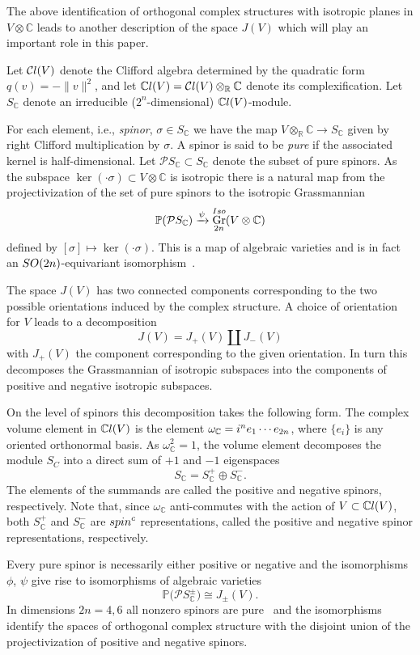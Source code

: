 \documentclass[11pt]{article}
\numberwithin{equation}{section}
\newcommand{\R}{\mathbb{R}}
\newcommand{\C}{\mathbb{C}}
\DeclareMathOperator{\Gr}{Gr}
\newcommand{\Cl}{\mathcal{C}{\rm l}}
\newcommand{\CCl}{\mathbb{C}{\rm l}}
\numberwithin{equation}{section}
\begin{document}
The above identification of orthogonal complex structures with isotropic planes in
$V\otimes \C$ leads to another description of the space $J(V)$ which will play an
important role in this paper.


Let $\Cl(V)$ denote the Clifford algebra determined by the quadratic form $q(v)=-\|v\|^2$, and let $\CCl(V)=\Cl(V)\otimes_\R \C$
denote its complexification. Let $S_{\C}$ denote an irreducible ($2^n$-dimensional) $\CCl(V)$-module.

For each element, i.e., \emph{spinor}, $\sigma \in S_{\C}$ we have the map $V\otimes_\R \C \to S_{\C}$ given by right Clifford multiplication by $\sigma$. A spinor is said to be \emph{pure} if the associated kernel is half-dimensional. Let ${\mathcal P}S _{\C} \subset S_\C$ denote the subset of pure spinors. As the subspace $\ker (\cdot \sigma) \subset V\otimes \C$ is isotropic
there is a natural map from the projectivization of the set of pure spinors to the isotropic Grassmannian
\[
\mathbb{P}( {\mathcal P}S _\C ) \xrightarrow{\psi} \Gr^{\rm Iso}_{2n}(V\otimes \C)
\]
defined by $[\sigma] \mapsto \ker (\cdot \sigma)$. This is a map of algebraic varieties and is in fact an ${\rm SO}(2n)$-equivariant isomorphism~\cite[Proposition~IV.9.7]{LM}.

The space $J(V)$ has two connected components corresponding to the two possible orientations induced by the complex structure. A choice of orientation for $V$ leads to a decomposition
\[J(V) = J_+(V) \coprod J_-(V)\]
with $J_+(V)$ the component corresponding to the given orientation. In turn this decomposes the Grassmannian of isotropic subspaces into the components of positive and negative isotropic subspaces.

On the level of spinors this decomposition takes the following form.
The complex volume element in $\CCl(V)$ is the element
$\omega_\C = {\rm i}^n e_1 \cdots e_{2n}$, where
$\{e_i\}$ is any oriented orthonormal basis. As $\omega_{\C}^2=1$, the volume element decomposes
the module $S_C$ into a direct sum of $+1$ and $-1$ eigenspaces
\[
S_\C = S_\C^+ \oplus S_\C^-.
\]
The elements of the summands are called the positive and negative spinors, respectively.
Note that, since $\omega_\C$ anti-commutes with the action of $V \subset \CCl(V)$, both
$S_\C^+$ and $S_\C^-$ are ${\rm spin}^{\rm c}$ representations, called the positive and negative spinor representations, respectively.

Every pure spinor is necessarily either positive or negative and the isomorphisms $\phi$, $\psi$ give rise to isomorphisms of algebraic varieties
\[
\mathbb{P}\big({\mathcal P}S _\C^\pm\big) \cong J_\pm(V).
\]
In dimensions $2n=4,6$ all nonzero spinors are pure~\cite[Remark~IV.9.12]{LM} and the isomorphisms identify the spaces
of orthogonal complex structure with the disjoint union of the projectivization of positive
and negative spinors.
\end{document}
